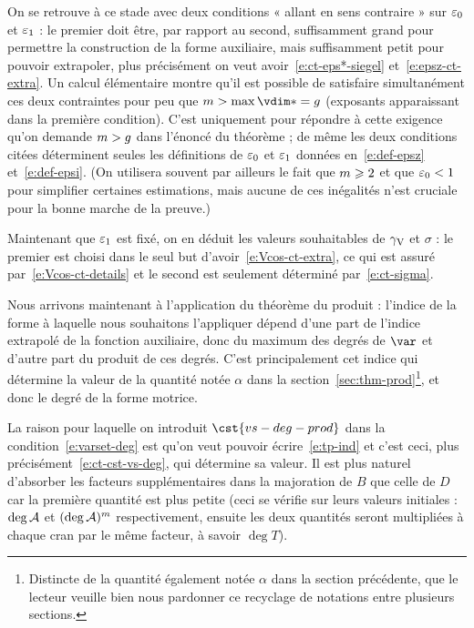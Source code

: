 On se retrouve à ce stade avec deux conditions « allant en sens contraire »
sur \( \varepsilon\sb0 \) et \( \varepsilon\sb1 \) : le premier doit être, par rapport au second,
suffisamment grand pour permettre la construction de la forme auxiliaire, mais
suffisamment petit pour pouvoir extrapoler, plus précisément on veut
avoir~\eqref{e:ct-eps*-siegel} et~\eqref{e:epsz-ct-extra}. Un calcul
élémentaire montre qu'il est possible de satisfaire simultanément ces deux
contraintes pour peu que \( \puiss > \max \vdim* = \genre \) (exposants
apparaissant dans la première condition).  C'est uniquement pour répondre à
cette exigence qu'on demande \( m > g \) dans l'énoncé du théorème ;
de même les deux conditions citées déterminent seules les définitions de \(
  \varepsilon\sb0 \) et \( \varepsilon\sb1 \) données en~\eqref{e:def-epsz} et~\eqref{e:def-epsi}.
(On utilisera souvent par ailleurs le fait que \( m \geqslant 2 \) et que \(
  \varepsilon\sb0 < 1 \) pour simplifier certaines estimations, mais aucune de ces
inégalités n'est cruciale pour la bonne marche de la preuve.)

Maintenant que \( \varepsilon\sb1 \) est fixé, on en déduit les valeurs souhaitables de
\( \gamma \sb{\mathrm{V}} \) et \( \sigma \) : le premier est choisi dans le seul but
d'avoir~\eqref{e:Vcos-ct-extra}, ce qui est assuré
par~\eqref{e:Vcos-ct-details} et le second est seulement déterminé
par~\eqref{e:ct-sigma}.

Nous arrivons maintenant à l'application du théorème du produit : l'indice de
la forme à laquelle nous souhaitons l'appliquer dépend d'une part de l'indice
extrapolé de la fonction auxiliaire, donc du maximum des degrés de \( \var \)
et d'autre part du produit de ces degrés. C'est principalement cet indice qui
détermine la valeur de la quantité notée \( \alpha \) dans la
section~\vref{sec:thm-prod}\footnote{Distincte de la quantité également notée
  \( \alpha \) dans la section précédente, que le lecteur veuille bien nous
  pardonner ce recyclage de notations entre plusieurs sections.}, et donc le
degré de la forme motrice.

La raison pour laquelle on introduit \( \cst{vs-deg-prod} \) dans la
condition~\eqref{e:varset-deg} est qu'on veut pouvoir écrire~\eqref{e:tp-ind}
et c'est ceci, plus précisément~\eqref{e:ct-cst-vs-deg}, qui détermine
sa valeur. Il est plus naturel d'absorber
les facteurs supplémentaires dans la majoration de \( B \) que celle de \( D
\) car la première quantité est  plus petite (ceci se vérifie
sur leurs valeurs initiales : \( \deg \mathcal A \) et \( (\deg \mathcal A)^m \)
respectivement, ensuite les deux quantités seront multipliées à chaque cran
par le même facteur, à savoir \( \deg T \)).

